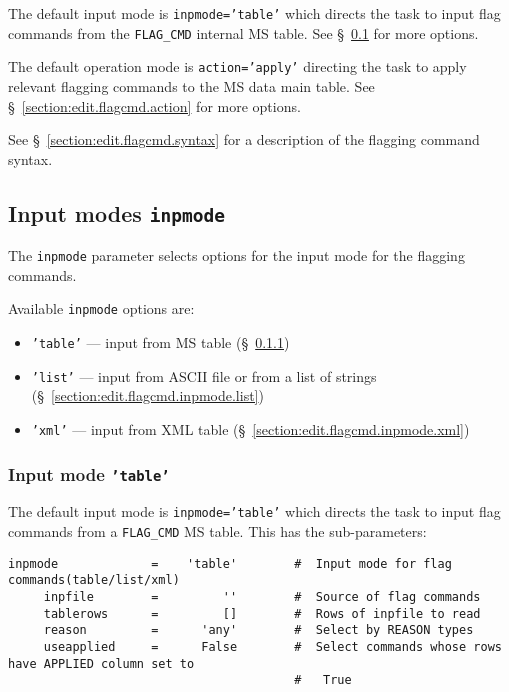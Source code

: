 The default input mode is {\tt inpmode='table'} which directs the
task to input flag commands from the {\tt FLAG\_CMD} internal MS
table. See \S~\ref{section:edit.flagcmd.inpmode} for more options.

The default operation mode is {\tt action='apply'} directing the
task to apply relevant flagging commands to the MS data main table.
See \S~\ref{section:edit.flagcmd.action} for more options.

See \S~\ref{section:edit.flagcmd.syntax} for a description of the
flagging command syntax.

\subsection{Input modes {\tt inpmode}}
\label{section:edit.flagcmd.inpmode}

The {\tt inpmode} parameter selects options for the input mode for
the flagging commands.

Available {\tt inpmode} options are:
\begin{itemize}
   \item {\tt 'table'} --- input from MS table (\S~\ref{section:edit.flagcmd.inpmode.table})
   \item {\tt 'list'} --- input from ASCII file or from a list of
     strings (\S~\ref{section:edit.flagcmd.inpmode.list})
   \item {\tt 'xml'} --- input from XML table (\S~\ref{section:edit.flagcmd.inpmode.xml})
\end{itemize}

\subsubsection{Input mode {\tt 'table'}}
\label{section:edit.flagcmd.inpmode.table}

The default input mode is {\tt inpmode='table'} which directs the
task to input flag commands from a {\tt FLAG\_CMD} MS table.  
This has the sub-parameters:
\small
\begin{verbatim}
inpmode             =    'table'        #  Input mode for flag commands(table/list/xml)
     inpfile        =         ''        #  Source of flag commands
     tablerows      =         []        #  Rows of inpfile to read
     reason         =      'any'        #  Select by REASON types
     useapplied     =      False        #  Select commands whose rows have APPLIED column set to
                                        #   True
\end{verbatim}
\normalsize

